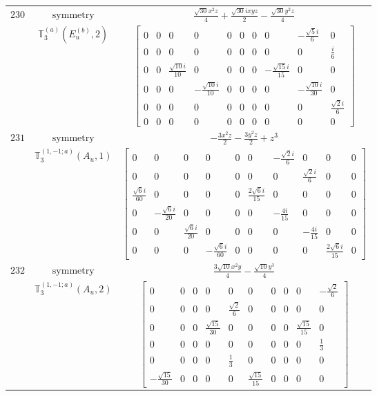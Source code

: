 \documentclass[fleqn,8pt,landscape]{jsarticle}
\begin{document}
\begin{longtable}{ccc}
$ 230 $ & $ \text{symmetry} $ & $ \frac{\sqrt{30} x^{2} z}{4} + \frac{\sqrt{30} i x y z}{2} - \frac{\sqrt{30} y^{2} z}{4} $ \\
$  $ & $ \mathbb{T}_{3}^{(a)}(E_{u}^{(b)},2) $ & $ \begin{bmatrix} 0 & 0 & 0 & 0 & 0 & 0 & 0 & 0 & - \frac{\sqrt{5} i}{6} & 0 \\ 0 & 0 & 0 & 0 & 0 & 0 & 0 & 0 & 0 & \frac{i}{6} \\ 0 & 0 & \frac{\sqrt{10} i}{10} & 0 & 0 & 0 & 0 & - \frac{\sqrt{15} i}{15} & 0 & 0 \\ 0 & 0 & 0 & - \frac{\sqrt{10} i}{10} & 0 & 0 & 0 & 0 & - \frac{\sqrt{10} i}{30} & 0 \\ 0 & 0 & 0 & 0 & 0 & 0 & 0 & 0 & 0 & \frac{\sqrt{2} i}{6} \\ 0 & 0 & 0 & 0 & 0 & 0 & 0 & 0 & 0 & 0 \end{bmatrix} $ \\ \hline
$ 231 $ & $ \text{symmetry} $ & $ - \frac{3 x^{2} z}{2} - \frac{3 y^{2} z}{2} + z^{3} $ \\
$  $ & $ \mathbb{T}_{3}^{(1,-1;a)}(A_{u},1) $ & $ \begin{bmatrix} 0 & 0 & 0 & 0 & 0 & 0 & - \frac{\sqrt{2} i}{6} & 0 & 0 & 0 \\ 0 & 0 & 0 & 0 & 0 & 0 & 0 & \frac{\sqrt{2} i}{6} & 0 & 0 \\ \frac{\sqrt{6} i}{60} & 0 & 0 & 0 & 0 & \frac{2 \sqrt{6} i}{15} & 0 & 0 & 0 & 0 \\ 0 & - \frac{\sqrt{6} i}{20} & 0 & 0 & 0 & 0 & - \frac{4 i}{15} & 0 & 0 & 0 \\ 0 & 0 & \frac{\sqrt{6} i}{20} & 0 & 0 & 0 & 0 & - \frac{4 i}{15} & 0 & 0 \\ 0 & 0 & 0 & - \frac{\sqrt{6} i}{60} & 0 & 0 & 0 & 0 & \frac{2 \sqrt{6} i}{15} & 0 \end{bmatrix} $ \\ \hline
$ 232 $ & $ \text{symmetry} $ & $ \frac{3 \sqrt{10} x^{2} y}{4} - \frac{\sqrt{10} y^{3}}{4} $ \\
$  $ & $ \mathbb{T}_{3}^{(1,-1;a)}(A_{u},2) $ & $ \begin{bmatrix} 0 & 0 & 0 & 0 & 0 & 0 & 0 & 0 & 0 & - \frac{\sqrt{2}}{6} \\ 0 & 0 & 0 & 0 & \frac{\sqrt{2}}{6} & 0 & 0 & 0 & 0 & 0 \\ 0 & 0 & 0 & \frac{\sqrt{15}}{30} & 0 & 0 & 0 & 0 & \frac{\sqrt{15}}{15} & 0 \\ 0 & 0 & 0 & 0 & 0 & 0 & 0 & 0 & 0 & \frac{1}{3} \\ 0 & 0 & 0 & 0 & \frac{1}{3} & 0 & 0 & 0 & 0 & 0 \\ - \frac{\sqrt{15}}{30} & 0 & 0 & 0 & 0 & \frac{\sqrt{15}}{15} & 0 & 0 & 0 & 0 \end{bmatrix} $ \\ \hline

\end{longtable}
\end{document}

